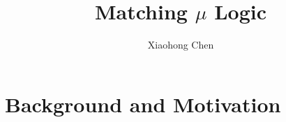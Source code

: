 \documentclass{amsart}
\title{Matching $\mu$ Logic}
\author{Xiaohong Chen}
\begin{document}
\maketitle

\section{Background and Motivation}

\begin{comment}
{We can have a long section about introduction and motivation, running for 2--3 pages. The idea is to emphasize language-independent verification, and say that \K is the best effort for doing that. And then we can say this paper provides foundations for
not just \K, but language-independent verification in general; or even more:
we could claim this paper is for language-independent approach in general, including execution (lambda calculus and contexts, etc.) and verification (reachability logic etc.), model checking (LTL etc.), and more. 
We should go for 2 pages if we only talk about motivation. 
We could go for 3 pages if we briefly talk about concrete results and
our approach.}

Program verification asks if a program
satisfies its formal specification.
Traditionally, program verification is powered by
a program logic such as 
Hoare logic, dynamic logic, or separation logic,
and a set of proof rules are used to define
the semantics of the target languages.
These language-specific program logics are often hard to
design and understand, non-executable, and error-prone,
and they do not easily adapt to language change.
An alternative approach is to translate 
target languages to some 
intermediate verification languages~(IVLs)
such as Boogie and Why,
and verification tools are developed for IVLs
in separation from target languages.
However, correct translation is hard and can miss
behavior detail, resulting in
false alarm in state-of-the-art verification tools.

Language-independent verification, in contrary, 
considers a language framework
where any language is given a formal executable semantics
and all tools for that language
are automatically generated by the framework in a
correct-by-construction manner.
The \K framework is such an language-independent framework,
and many languages have been defined a formal semantics,
including C, Java, and JavaScript.

The goal of this paper is to provide foundations for
a collection that is currently used in the language-independent
framework \K.
In particular, we want to show that
language-independent verification is all about 
searching for proofs,
and \K is a best-effort implementation of such a proof search.
Since we consider verification of
any properties written in any logics 
of any programs written in any languages,
we need an expressive ``unified'' logic,
which subsumes all popular program logics that are used
for verification and ``static'' logics that are used
to state program properties. 
Previous work has shown that matching logic \dots.
\end{comment}
\end{document}
